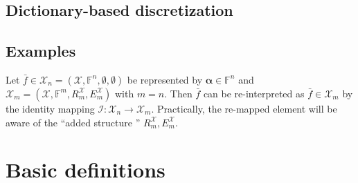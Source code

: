 \documentclass[a4paper]{paper}
\newcommand{\VecSpace}[1]{\mathscr{#1}}
\newcommand{\Field}{\mathbb{F}}
\newcommand{\Op}[1]{\mathcal{#1}}
\newcommand*{\EXT}[2]{\ensuremath{E_{#1}^{#2}}}
\newcommand*{\REST}[2]{\ensuremath{R_{#1}^{#2}}}
\newcommand*{\RmX}{\ensuremath{\REST{m}{\VecSpace{X}}}}
\newcommand*{\EmX}{\ensuremath{\EXT{m}{\VecSpace{X}}}}
\newcommand{\valpha}{\boldsymbol{\alpha}}
\begin{document}
\subsection{Dictionary-based discretization}
%

\subsection{Examples}

\begin{example}[Re-interpretation]
 Let $\bar f \in \VecSpace{X}_n = (\VecSpace{X}, \Field^n, \emptyset, \emptyset)$ be represented by $\valpha \in \Field^n$ and 
 $\VecSpace{X}_m = (\VecSpace{X}, \Field^m, \RmX, \EmX)$ with $m=n$. Then $\bar f$ can be re-interpreted as $\bar f \in \VecSpace{X}_m$ by 
 the identity mapping $\Op{I}: \VecSpace{X}_n \to \VecSpace{X}_m$. Practically, the re-mapped element will be aware of the ``added 
 structure '' $\RmX, \EmX$.
\end{example}





\cleardoublepage
\appendix
\section{Basic definitions}
\end{document}
